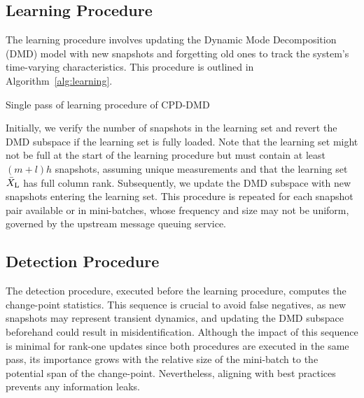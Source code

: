 \subsection{Learning Procedure}\label{learn-cpd}
The learning procedure involves updating the Dynamic Mode Decomposition (DMD) model with new snapshots and forgetting old ones to track the system's time-varying characteristics. This procedure is outlined in Algorithm~\ref{alg:learning}.

\begin{algorithm}
	\caption{Single pass of learning procedure of CPD-DMD}\label{alg:learning}
	\begin{algorithmic}[1]
		\ENDIF{}
	\end{algorithmic}
\end{algorithm}

Initially, we verify the number of snapshots in the learning set and revert the DMD subspace if the learning set is fully loaded. Note that the learning set might not be full at the start of the learning procedure but must contain at least \((m + l) h\) snapshots, assuming unique measurements and that the learning set \(\bar{X} _{\text{L}}\) has full column rank. Subsequently, we update the DMD subspace with new snapshots entering the learning set. This procedure is repeated for each snapshot pair available or in mini-batches, whose frequency and size may not be uniform, governed by the upstream message queuing service.

\subsection{Detection Procedure}\label{detect-cpd}
The detection procedure, executed before the learning procedure, computes the change-point statistics. This sequence is crucial to avoid false negatives, as new snapshots may represent transient dynamics, and updating the DMD subspace beforehand could result in misidentification. Although the impact of this sequence is minimal for rank-one updates since both procedures are executed in the same pass, its importance grows with the relative size of the mini-batch to the potential span of the change-point. Nevertheless, aligning with best practices prevents any information leaks.

